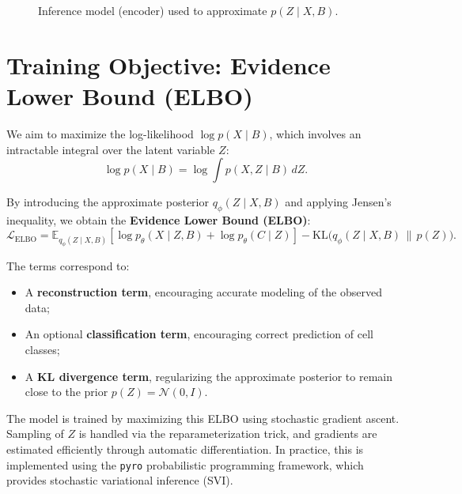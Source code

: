 \documentclass[11pt,a4paper]{article}
\begin{document}
\begin{figure}[h!]
\centering
{}
\caption{Inference model (encoder) used to approximate $p(Z \mid X,B)$.}
\end{figure}

\section{Training Objective: Evidence Lower Bound (ELBO)}

We aim to maximize the log-likelihood $\log p(X \mid B)$, which involves an intractable integral over the latent variable $Z$:
\[
\log p(X \mid B) = \log \int p(X, Z \mid B) \, dZ.
\]

By introducing the approximate posterior $q_\phi(Z \mid X, B)$ and applying Jensen's inequality, we obtain the \textbf{Evidence Lower Bound (ELBO)}:
\[
\mathcal{L}_{\text{ELBO}} =
\mathbb{E}_{q_\phi(Z \mid X, B)}[\log p_\theta(X \mid Z, B) + \log p_\theta(C \mid Z)]
- \mathrm{KL}\big(q_\phi(Z \mid X, B) \, \| \, p(Z)\big).
\]

\noindent
The terms correspond to:
\begin{itemize}
  \item A \textbf{reconstruction term}, encouraging accurate modeling of the observed data;
  \item An optional \textbf{classification term}, encouraging correct prediction of cell classes;
  \item A \textbf{KL divergence term}, regularizing the approximate posterior to remain close to the prior $p(Z) = \mathcal{N}(0, I)$.
\end{itemize}

The model is trained by maximizing this ELBO using stochastic gradient ascent. Sampling of $Z$ is handled via the reparameterization trick, and gradients are estimated efficiently through automatic differentiation. In practice, this is implemented using the \texttt{pyro} probabilistic programming framework, which provides stochastic variational inference (SVI).
\end{document}
